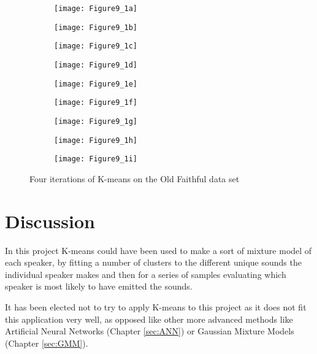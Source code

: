 \begin{figure}[H]
	\centering
	\begin{subfigure}[H]{0.3\linewidth}
		\texttt{[image: Figure9\_1a]}
		\label{fig:F9.1a}
	\end{subfigure}
	\quad
	\begin{subfigure}[H]{0.3\linewidth}
		\texttt{[image: Figure9\_1b]}
		\label{fig:F9.1b}
	\end{subfigure}
	\quad
	\begin{subfigure}[H]{0.3\linewidth}
		\texttt{[image: Figure9\_1c]}
		\label{fig:F9.1c}
	\end{subfigure}
	
	
	\begin{subfigure}[H]{0.3\linewidth}
		\texttt{[image: Figure9\_1d]}
		\label{fig:F9.1d}
	\end{subfigure}
	\quad
	\begin{subfigure}[H]{0.3\linewidth}
		\texttt{[image: Figure9\_1e]}
		\label{fig:F9.1e}
	\end{subfigure}
	\quad
	\begin{subfigure}[H]{0.3\linewidth}
		\texttt{[image: Figure9\_1f]}
		\label{fig:F9.1f}
	\end{subfigure}
	

	\begin{subfigure}[H]{0.3\linewidth}
		\texttt{[image: Figure9\_1g]}
		\label{fig:F9.1g}
	\end{subfigure}
	\quad
	\begin{subfigure}[H]{0.3\linewidth}
		\texttt{[image: Figure9\_1h]}
		\label{fig:F9.1h}
	\end{subfigure}
	\quad
	\begin{subfigure}[H]{0.3\linewidth}
		\texttt{[image: Figure9\_1i]}
		\label{fig:F9.1i}
	\end{subfigure}
	
	\caption{Four iterations of K-means on the Old Faithful data set}

\end{figure}

\section{Discussion}

In this project K-means could have been used to make a sort of mixture model of each speaker, by fitting a number of clusters to the different unique sounds the individual speaker makes and then for a series of samples evaluating which speaker is most likely to have emitted the sounds.

It has been elected not to try to apply K-means to this project as it does not fit this application very well, as opposed like other more advanced methods like Artificial Neural Networks (Chapter \ref{sec:ANN}) or Gaussian Mixture Models (Chapter \ref{sec:GMM}).
  